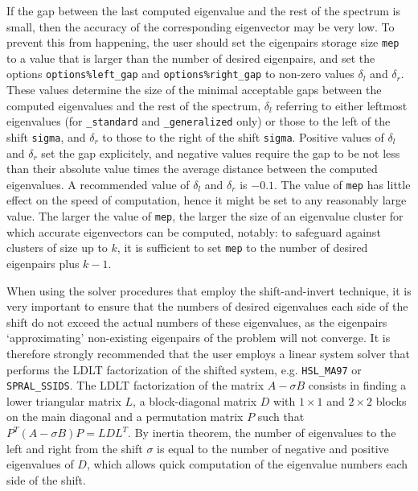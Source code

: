 If the gap %
between the last computed eigenvalue 
and the rest of the spectrum is small,
then the accuracy of the corresponding eigenvector may be very low.
To prevent this from happening,
the user should set the eigenpairs storage size {\tt mep}
to a value that is larger than the number of desired eigenpairs,
and set the options 
{\tt options\%left\_gap}
and
{\tt options\%right\_gap}
to non-zero values $\delta_l$ and $\delta_r$.
These values
determine the size of the minimal acceptable gaps
between the computed eigenvalues and the rest of the spectrum,
$\delta_l$ referring to either leftmost eigenvalues
(for {\tt \solver\_standard} and {\tt \solver\_generalized} only)
or those to the left of the shift {\tt sigma},
and $\delta_r$
to those to the right of the shift {\tt sigma}.
Positive values of $\delta_l$ and $\delta_r$
set the gap explicitely,
and negative values
require the gap to be not less than their absolute value times
the average distance between the computed eigenvalues.
A recommended value of $\delta_l$ and $\delta_r$ is $-0.1$.
The value of {\tt mep} %
has little effect on
the speed of computation,
hence it might be set to any reasonably large value.
The larger the value of {\tt mep}, 
the larger the size of an eigenvalue cluster
for which accurate eigenvectors can be computed, notably:
to safeguard against clusters of size up to $k$,
it is sufficient to set {\tt mep} to the number of desired eigenpairs
plus $k - 1$.

When using the solver procedures that employ the shift-and-invert technique,
it is very important to ensure that the numbers of desired eigenvalues
each side of the shift do not exceed the actual numbers of these eigenvalues,
as the eigenpairs `approximating' non-existing eigenpairs of the problem
will not converge.
It is therefore strongly recommended that the user employs 
a linear system solver that performs
the LDLT
factorization of %
the shifted system,
e.g. {\tt HSL\_MA97} or {\tt SPRAL\_SSIDS}.
The LDLT factorization of the matrix
$A - \sigma B$ consists in finding a lower triangular
matrix $L$, a block-diagonal matrix $D$
with $1\times 1$ and $2\times 2$ blocks on the main diagonal
and a permutation matrix $P$
such that $P^T(A - \sigma B)P = L D L^T$.
By inertia theorem,
the number of eigenvalues to the left and right from 
the shift $\sigma$
is equal to the number of negative and positive eigenvalues of $D$,
which allows quick computation of the eigenvalue numbers
each side of the shift. %

